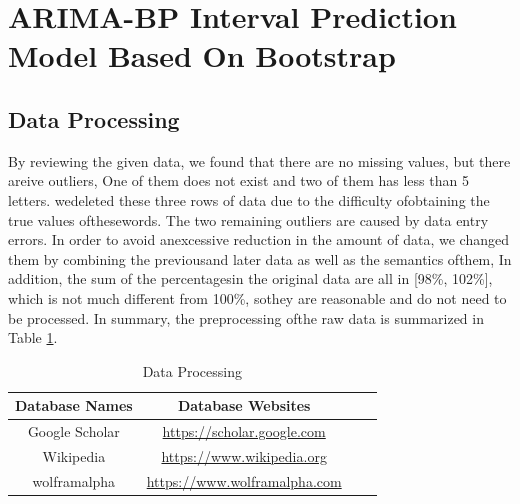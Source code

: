 \documentclass[12pt]{ctexart}
\begin{document}

\newpage
\section{ARIMA-BP Interval Prediction Model Based On Bootstrap}
\subsection{Data Processing}
By reviewing the given data, we found that there are no missing values, but there areive outliers, One of them does not exist and two of them has less than 5 letters. wedeleted these three rows of data due to the difficulty ofobtaining the true values ofthesewords. The two remaining outliers are caused by data entry errors. In order to avoid anexcessive reduction in the amount of data, we changed them by combining the previousand later data as well as the semantics ofthem, In addition, the sum of the percentagesin the original data are all in [98\%, 102\%], which is not much different from 100\%, sothey are reasonable and do not need to be processed. In summary, the preprocessing ofthe raw data is summarized in Table \ref{tb:data}.

\begin{table}[htbp]%
	\begin{center}
		\caption{Data Processing}
		\begin{tabular}{c c c c}
			\toprule[1.5pt]
			\multicolumn{1}{m{5cm}}{\centering \textbf{Database Names}}
			               & \multicolumn{1}{m{10cm}}{\centering \textbf{Database Websites}}   \\
			\midrule
			Google Scholar & \href{https://scholar.google.com} {https://scholar.google.com}    \\
			Wikipedia      & \href{https://www.wikipedia.org}{https://www.wikipedia.org}       \\
			wolframalpha   & \href{https://www.wolframalpha.com}{https://www.wolframalpha.com} \\
			\bottomrule[1.5pt]
		\end{tabular}
		\label{tb:data}
	\end{center}
\end{table}
\vspace{-1cm}%
\end{document}
